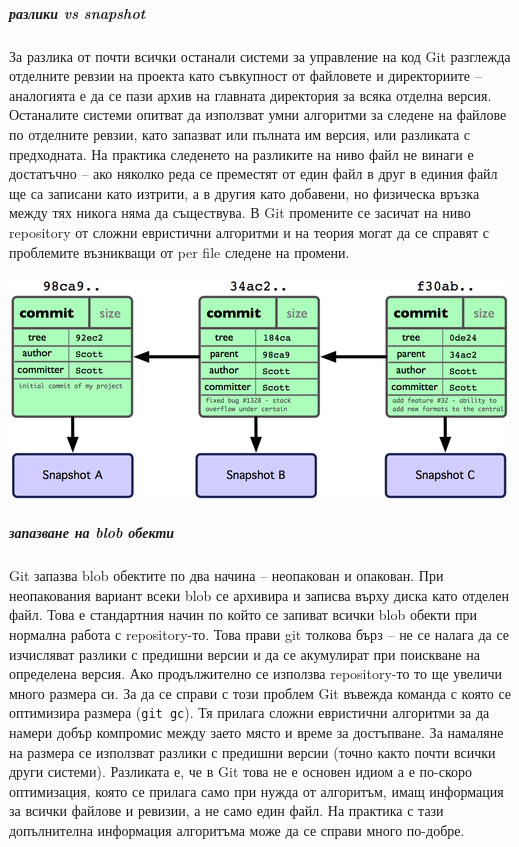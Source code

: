 \documentclass[a4paper]{article}
\begin{document}
      \subparagraph{разлики vs snapshot} За разлика от почти всички останали
      системи за управление на код Git разглежда отделните ревзии на проекта
      като съвкупност от файловете и директориите -- аналогията е да се пази
      архив на главната директория за всяка отделна версия. Останалите системи
      опитват да използват умни алгоритми за следене на файлове по отделните
      ревзии, като запазват или пълната им версия, или разликата с предходната.
      На практика следенето на разликите на ниво файл не винаги е достатъчно --
      ако няколко реда се преместят от един файл в друг в единия файл ще са
      записани като изтрити, а в другия като добавени, но физическа връзка
      между тях никога няма да съществува. В Git промените се засичат на ниво
      repository от сложни евристични алгоритми и на теория могат да се справят
      с проблемите възникващи от per file следене на промени.

      \includegraphics[scale=1.0]{git_commits.png}

      \subparagraph{запазване на blob обекти}
      Git запазва blob обектите по два начина -- неопакован и опакован. При
      неопакования вариант всеки blob се архивира и записва върху диска като
      отделен файл. Това е стандартния начин по който се запиват всички blob
      обекти при нормална работа с repository-то. Това прави git толкова бърз
      -- не се налага да се изчисляват разлики с предишни версии и да се
      акумулират при поискване на определена версия. Ако продължително се
      използва repository-то то ще увеличи много размера си. За да се справи
      с този проблем Git въвежда команда с която се оптимизира размера
      (\texttt{git gc}). Тя прилага сложни евристични алгоритми за да намери
      добър компромис между заето място и време за достъпване. За намаляне на
      размера се използват разлики с предишни версии (точно както почти всички
      други системи). Разликата е, че в Git това не е основен идиом
      а е по-скоро оптимизация, която се прилага само при нужда от алгоритъм,
      имащ информация за всички файлове и ревизии, а не само един файл. На
      практика с тази допълнителна информация алгоритъма може да се справи
      много по-добре.
\end{document}
